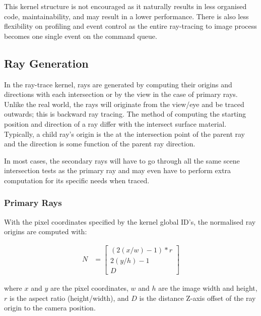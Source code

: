 \documentclass[final]{cmpreport}
\begin{document}
This kernel structure is not encouraged \citep{laine2013megakernels} as it naturally results in less organised code, maintainability, and may result in a lower performance. There is also less flexibility on profiling and event control as the entire ray-tracing to image process becomes one single event on the command queue.

\subsection{Ray Generation}

In the ray-trace kernel, rays are generated by computing their origins and directions with each intersection or by the view in the case of primary rays. Unlike the real world, the rays will originate from the view/eye and be traced outwards; this is backward ray tracing. The method of computing the starting position and direction of a ray differ with the intersect surface material. Typically, a child ray's origin is the at the intersection point of the parent ray and the direction is some function of the parent ray direction.

In most cases, the secondary rays will have to go through all the same scene intersection tests as the primary ray and may even have to perform extra computation for its specific needs when traced.

\subsubsection{Primary Rays}

With the pixel coordinates specified by the kernel global ID's, the normalised ray origins are computed with:

\begin{align}
    N &= \begin{bmatrix}
        (2(x / w) - 1) * r \\
        2(y / h) - 1 \\
        D
    \end{bmatrix}
\end{align}

where $x$ and $y$ are the pixel coordinates, $w$ and $h$ are the image width and height, $r$ is the aspect ratio (height/width), and $D$ is the distance Z-axis offset of the ray origin to the camera position.
\end{document}

